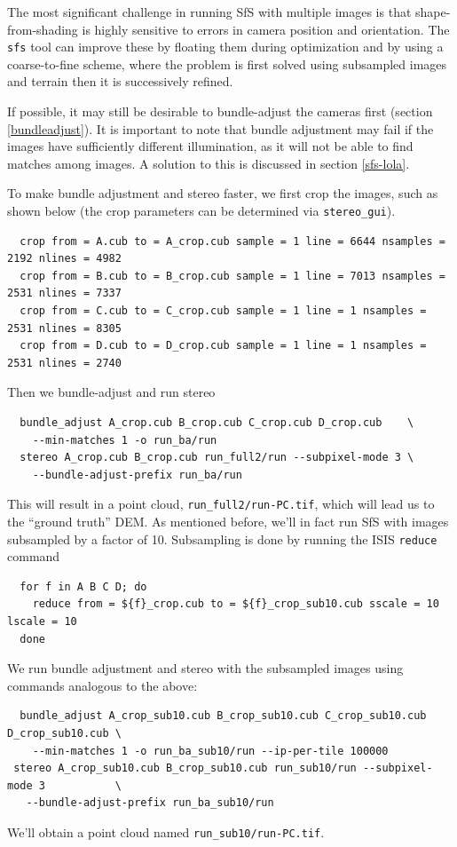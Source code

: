 The most significant challenge in running SfS with multiple images is
that shape-from-shading is highly sensitive to errors in camera position
and orientation. The \texttt{sfs} tool can improve these by floating
them during optimization and by using a coarse-to-fine scheme, where
the problem is first solved using subsampled images and terrain then
it is successively refined.

If possible, it may still be desirable to bundle-adjust the cameras first
(section \ref{bundleadjust}). It is important to note that bundle adjustment may
fail if the images have sufficiently different illumination, as it will
not be able to find matches among images. A solution to this is discussed
in section \ref{sfs-lola}.

To make bundle adjustment and stereo faster, we first crop the images,
such as shown below (the crop parameters can be determined via
\texttt{stereo\_gui}).
\begin{verbatim}
  crop from = A.cub to = A_crop.cub sample = 1 line = 6644 nsamples = 2192 nlines = 4982
  crop from = B.cub to = B_crop.cub sample = 1 line = 7013 nsamples = 2531 nlines = 7337
  crop from = C.cub to = C_crop.cub sample = 1 line = 1 nsamples = 2531 nlines = 8305
  crop from = D.cub to = D_crop.cub sample = 1 line = 1 nsamples = 2531 nlines = 2740
\end{verbatim}
Then we bundle-adjust and run stereo
\begin{verbatim}
  bundle_adjust A_crop.cub B_crop.cub C_crop.cub D_crop.cub    \
    --min-matches 1 -o run_ba/run
  stereo A_crop.cub B_crop.cub run_full2/run --subpixel-mode 3 \
    --bundle-adjust-prefix run_ba/run
\end{verbatim}

This will result in a point cloud, \verb#run_full2/run-PC.tif#, which will
lead us to the ``ground truth'' DEM. As mentioned
before, we'll in fact run SfS with images subsampled by a factor of
10. Subsampling is done by running the ISIS \texttt{reduce} command
\begin{verbatim}
  for f in A B C D; do 
    reduce from = ${f}_crop.cub to = ${f}_crop_sub10.cub sscale = 10 lscale = 10
  done
\end{verbatim}

We run bundle adjustment and stereo with the subsampled images using
commands analogous to the above:
\begin{verbatim}
  bundle_adjust A_crop_sub10.cub B_crop_sub10.cub C_crop_sub10.cub D_crop_sub10.cub \
    --min-matches 1 -o run_ba_sub10/run --ip-per-tile 100000
 stereo A_crop_sub10.cub B_crop_sub10.cub run_sub10/run --subpixel-mode 3           \
   --bundle-adjust-prefix run_ba_sub10/run
\end{verbatim}
We'll obtain a point cloud named \verb#run_sub10/run-PC.tif#.

